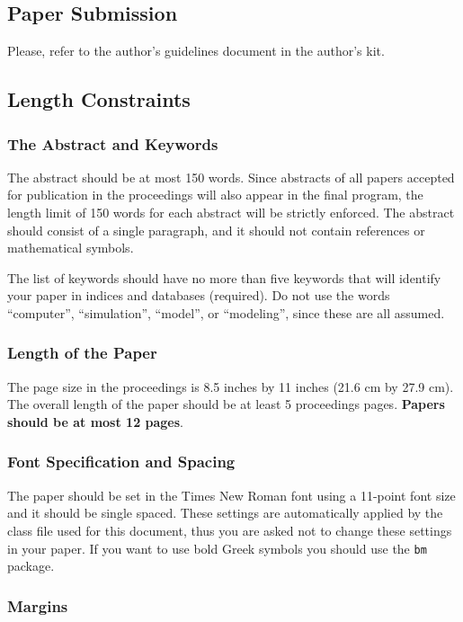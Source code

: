 \documentclass{scspaperproc}
\theoremstyle{scsthe}
\begin{document}
\subsection{Paper Submission}
Please, refer to the author's guidelines document in the author's kit.


\subsection{Length Constraints}

\subsubsection{The Abstract and Keywords}
The abstract should be at most 150 words. Since abstracts of all papers accepted for publication in the proceedings will also appear in the final program, the length limit of 150 words for each abstract will be strictly enforced. The abstract should consist of a single paragraph, and it should not contain references or mathematical symbols. 

The list of keywords should have no more than five keywords that will identify your paper in indices and databases (required).
Do not use the words “computer”, “simulation”, “model”, or “modeling”, since these are all assumed.

\subsubsection{Length of the Paper}
The page size in the proceedings is 8.5 inches by 11 inches (21.6 cm by 27.9 cm). The overall length of the paper should be at least 5 proceedings pages. \textbf{Papers should be at most 12 pages}.

\subsubsection{Font Specification and Spacing}
The paper should be set in the Times New Roman font using a 11-point font size and it should be single spaced.
These settings are automatically applied by the class file used for this document, thus you are asked not to change these settings in your paper. If you want to use bold Greek symbols you should use the \texttt{bm} package.

\subsubsection{Margins}
\label{sec:margins}
\end{document}
